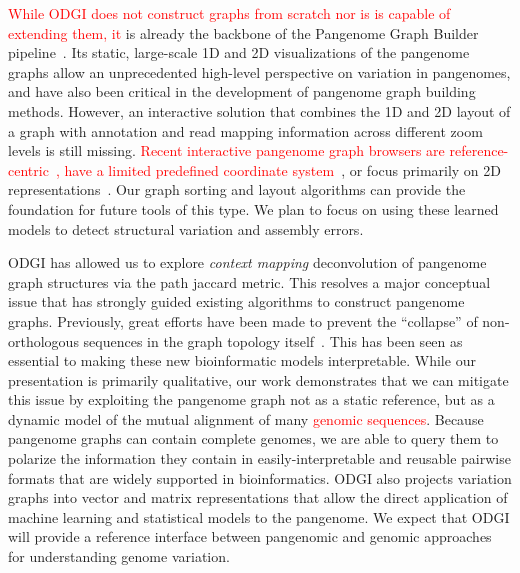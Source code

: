\documentclass{bioinfo}
\newcommand{\REVIEWED}[1]{{\textcolor{Red}{#1}}}
\begin{document}
\REVIEWED{While ODGI does not construct graphs from scratch nor is is capable of extending them, it} is already the backbone of the Pangenome Graph Builder pipeline~\citep{pggb}.
Its static, large-scale 1D and 2D visualizations of the pangenome graphs allow an unprecedented high-level perspective on variation in pangenomes, and have also been critical in the development of pangenome graph building methods.  %
However, an interactive solution that combines the 1D and 2D layout of a graph with annotation and read mapping information across different zoom levels is still missing.
\REVIEWED{Recent interactive pangenome graph browsers are reference-centric~\citep{Beyer2019, Yokoyama2019}, have a limited predefined coordinate system~\citep{Durant2021}}, or focus primarily on 2D representations~\citep{Wick_2015, Gonnella2018}.
Our graph sorting and layout algorithms can provide the foundation for future tools of this type.
We plan to focus on using these learned models to detect structural variation and assembly errors.

ODGI has allowed us to explore \textit{context mapping} deconvolution of pangenome graph structures via the path jaccard metric.
This resolves a major conceptual issue that has strongly guided existing algorithms to construct pangenome graphs.
Previously, great efforts have been made to prevent the ``collapse'' of non-orthologous sequences in the graph topology itself~\citep{Li:2020}.
This has been seen as essential to making these new bioinformatic models interpretable.
While our presentation is primarily qualitative, our work demonstrates that we can mitigate this issue by exploiting the pangenome graph not as a static reference, but as a dynamic model of the mutual alignment of many \REVIEWED{genomic sequences}.
Because pangenome graphs can contain complete genomes, we are able to query them to polarize the information they contain in easily-interpretable and reusable pairwise formats that are widely supported in bioinformatics.
ODGI also projects variation graphs into vector and matrix representations that allow the direct application of machine learning and statistical models to the pangenome.
We expect that ODGI will provide a reference interface between pangenomic and genomic approaches for understanding genome variation.
\end{document}
